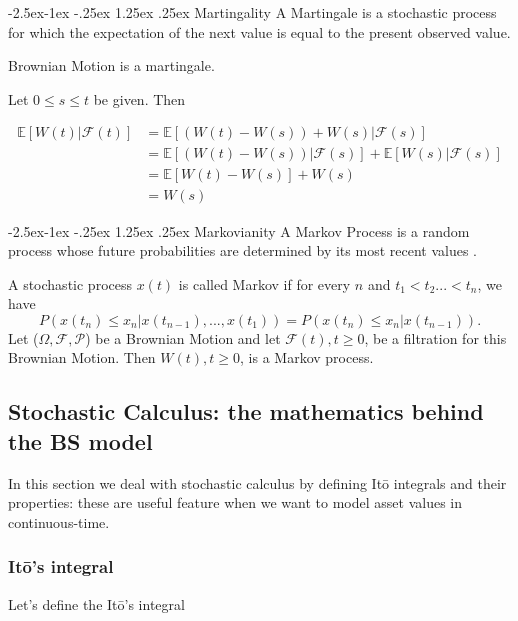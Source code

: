 \documentclass[paper=a4, fontsize=12pt]{scrartcl} %
\makeatletter
\numberwithin{equation}{section}
\renewcommand\paragraph{\@startsection{paragraph}{4}{\z@}%
            {-2.5ex\@plus -1ex \@minus -.25ex}%
            {1.25ex \@plus .25ex}%
            {\normalfont\normalsize\bfseries}}
\makeatother
\begin{document}
\paragraph{Martingality}
A Martingale is a stochastic process for which the expectation of the next value is equal to the present observed value.	\par
Brownian Motion is a martingale. \par 
Let $ 0 \leq s \leq t$ be given. Then

		\begin{equation}	
		\begin{aligned}
			\mathbb{E}[W(t)|\mathcal{F}(t)] &= \mathbb{E}[(W(t)-W(s)) + W(s) | \mathcal{F}(s)] \\
									&= \mathbb{E}[(W(t)-W(s))|\mathcal{F}(s)] + \mathbb{E}[W(s) | \mathcal{F}(s)] \\
									&= \mathbb{E}[W(t)-W(s)] + W(s)\\
									&= W(s)
		\end{aligned}
		\end{equation}

\paragraph{Markovianity}
A Markov Process is a random process whose future probabilities are determined by its most recent values \cite{papoulis} \cite{weisstein} . \par
A stochastic process $x(t)$ is called Markov if for every $n$ and $t_1<t_2...<t_n$, we have
	\begin{equation}
 		P(x(t_n) \leq x_n | x(t_{n-1}),...,x(t_1))  = P(x(t_n) \leq x_n | x(t_{n-1})). 
	\end{equation}
Let ($\Omega, \mathcal{F}, \mathcal{P}$) be a Brownian Motion and let $\mathcal{F}(t), t \geq 0$, be a filtration for this Brownian Motion. Then $W(t), t \geq 0$, is a Markov process.

\subsection{Stochastic Calculus: the mathematics behind the BS model}
In this section we deal with stochastic calculus by defining It\={o} integrals and their properties: these are useful feature when we want to model asset values in continuous-time.




\subsubsection{It\={o}'s integral}
Let's define the It\={o}'s integral
\end{document}
